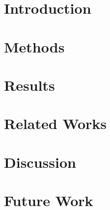 \documentclass[letterpaper]{article} %
\begin{document}




\section{Introduction}


\section{Methods}


\section{Results}


\section{Related Works}


\section{Discussion}


\section{Future Work}



\end{document}
